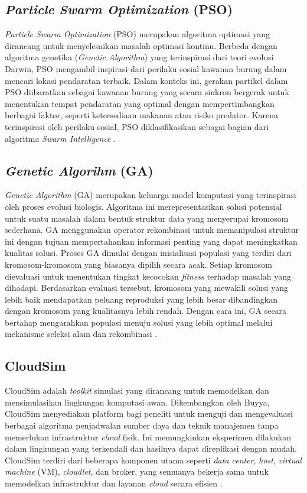 \subsection{\textit{Particle Swarm Optimization} (PSO)}
\textit{Particle Swarm Optimization} (PSO) merupakan algoritma optimasi yang dirancang untuk menyelesaikan masalah optimasi kontinu. Berbeda dengan algoritma genetika (\textit{Genetic Algorithm}) yang terinspirasi dari teori evolusi Darwin, PSO mengambil inspirasi dari perilaku sosial kawanan burung dalam mencari lokasi pendaratan terbaik. Dalam konteks ini, gerakan partikel dalam PSO diibaratkan sebagai kawanan burung yang secara sinkron bergerak untuk menentukan tempat pendaratan yang optimal dengan mempertimbangkan berbagai faktor, seperti ketersediaan makanan atau risiko predator. Karena terinspirasi oleh perilaku sosial, PSO diklasifikasikan sebagai bagian dari algoritma \textit{Swarm Intelligence} \parencite{Vanneschi2023}.

\subsection{\textit{Genetic Algorihm} (GA)}
\textit{Genetic Algorithm} (GA) merupakan keluarga model komputasi yang terinspirasi oleh proses evolusi biologis. Algoritma ini merepresentasikan solusi potensial untuk suatu masalah dalam bentuk struktur data yang menyerupai kromosom sederhana. GA menggunakan operator rekombinasi untuk memanipulasi struktur ini dengan tujuan mempertahankan informasi penting yang dapat meningkatkan kualitas solusi. Proses GA dimulai dengan inisialisasi populasi yang terdiri dari kromosom-kromosom yang biasanya dipilih secara acak. Setiap kromosom dievaluasi untuk menentukan tingkat kecocokan \textit{fitness} terhadap masalah yang dihadapi. Berdasarkan evaluasi tersebut, kromosom yang mewakili solusi yang lebih baik mendapatkan peluang reproduksi yang lebih besar dibandingkan dengan kromosom yang kualitasnya lebih rendah. Dengan cara ini, GA secara bertahap mengarahkan populasi menuju solusi yang lebih optimal melalui mekanisme seleksi alam dan rekombinasi \parencite{Mathew2019}.

\subsection{CloudSim}
CloudSim adalah \textit{toolkit} simulasi yang dirancang untuk memodelkan dan mensimulasikan lingkungan komputasi awan. Dikembangkan oleh Buyya, CloudSim menyediakan platform bagi peneliti untuk menguji dan mengevaluasi berbagai algoritma penjadwalan sumber daya dan teknik manajemen tanpa memerlukan infrastruktur \textit{cloud} fisik. Ini memungkinkan eksperimen dilakukan dalam lingkungan yang terkendali dan hasilnya dapat direplikasi dengan mudah. CloudSim terdiri dari beberapa komponen utama seperti \textit{data center}, \textit{host}, \textit{virtual machine} (VM), \textit{cloudlet}, dan broker, yang semuanya bekerja sama untuk memodelkan infrastruktur dan layanan \textit{cloud} secara efisien \parencite{Buyya2009}.

